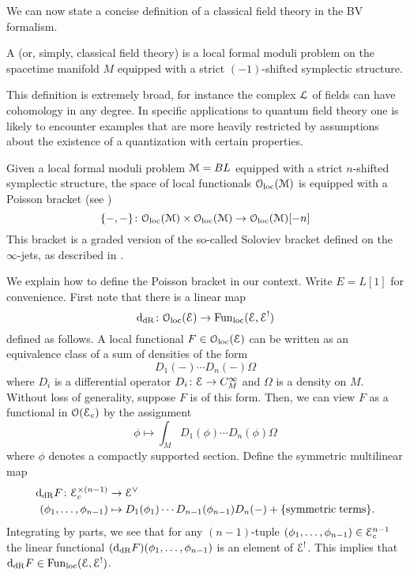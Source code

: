 \documentclass[10pt, oneside]{article}
\begin{document}
We can now state a concise definition of a classical field theory in the BV formalism.

\begin{definition} \label{classical_BV_def}
A  (or, simply, classical field theory) is a local formal moduli problem on the spacetime manifold $M$ equipped with a strict $(-1)$-shifted symplectic structure.
\label{def:classicalfieldtheory}
\end{definition}

\begin{remark}
This definition is extremely broad, for instance the complex $\mathcal L$ of fields can have cohomology in any degree.  In specific applications to quantum field theory one is likely to encounter examples that are more heavily restricted by assumptions about the existence of a quantization with certain properties.
\end{remark}

Given a local formal moduli problem $\mathcal M = BL$ equipped with a strict $n$-shifted symplectic structure, the space of local functionals $\mathcal{O}_{\rm loc}(\mathcal M)$ is equipped with a Poisson bracket (see \cite[Chapter 5.3]{CostelloBook}) 
\[
\{-,-\}\colon \mathcal{O}_{\rm loc}(\mathcal M) \times \mathcal{O}_{\rm loc}(\mathcal M) \to \mathcal{O}_{\rm loc}(\mathcal M)[-n]
\]
This bracket is a graded version of the so-called Soloviev bracket \cite{Soloviev} defined on the $\infty$-jets, as described in \cite[Section 4]{GetzlerBracket}. 

We explain how to define the Poisson bracket in our context. Write $E = L[1]$ for convenience. First note that there is a linear map
\[
{\rm d}_{\mathrm{dR}} \colon \mathcal{O}_{\rm loc}(\mathcal E) \to {\rm Fun}_{\rm loc}(\mathcal E, \mathcal E^!) 
\]
defined as follows. 
A local functional $F \in  \mathcal{O}_{\rm loc}(\mathcal E)$ can be written as an equivalence class of a sum of densities of the form
\[
D_1(-) \cdots D_n(-) \Omega
\]
where $D_i$ is a differential operator $D_i \colon \mathcal E \to C^\infty_M$ and $\Omega$ is a density on $M$. 
Without loss of generality, suppose $F$ is of this form. 
Then, we can view $F$ as a functional in $\mathcal O(\mathcal E_c)$ by the assignment
\[
\phi \mapsto \int_M D_1(\phi) \cdots D_n(\phi) \Omega
\]
where $\phi$ denotes a compactly supported section. 
Define the symmetric multilinear map
\begin{align*}
{\rm d}_{\mathrm{dR}} F  \colon  \mathcal E_c^{\times (n-1)} & \to  \mathcal E^\vee \\
 (\phi_1, \ldots, \phi_{n-1}) & \mapsto  D_1(\phi_1) \cdots D_{n-1}(\phi_{n-1}) D_{n} (-) + \{{\rm symmetric\;terms}\} .
\end{align*}
Integrating by parts, we see that for any $(n-1)$-tuple $(\phi_1, \ldots, \phi_{n-1}) \in \mathcal E_c^{n-1}$ the linear functional $({\rm d}_{\mathrm{dR}} F) (\phi_1,\ldots, \phi_{n-1})$ is an element of $\mathcal E^!$. 
This implies that ${\rm d}_{\mathrm{dR}} F \in {\rm Fun}_{\rm loc}(\mathcal E, \mathcal E^!)$.
\end{document}
